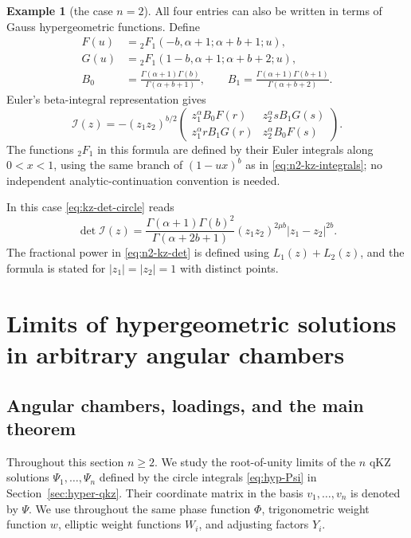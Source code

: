 \documentclass[12pt]{amsart}
\theoremstyle{definition}
\numberwithin{equation}{section}
\theoremstyle{definition}
\newtheorem*{example}{Example}
\let\mc\mathcal
\let\ge\geqslant
\def\beq{\begin{equation}}
\def\eeq{\end{equation}}
\begin{document}
\begin{example}[the case $n=2$]
All four entries can also be written in terms of Gauss
hypergeometric functions. Define
\[
 \begin{aligned}
 F(u)&={}_2F_1(-b,\alpha+1;\alpha+b+1;u),\\
 G(u)&={}_2F_1(1-b,\alpha+1;\alpha+b+2;u),\\
 B_0&=\frac{\Gamma(\alpha+1)\Gamma(b)}
 {\Gamma(\alpha+b+1)},\qquad
 B_1=\frac{\Gamma(\alpha+1)\Gamma(b+1)}
 {\Gamma(\alpha+b+2)}.
 \end{aligned}
\]
Euler's beta-integral representation gives
\beq\label{eq:n2-kz-hypergeom}
 \boxed{\quad
 \mc I(z)=-(z_1z_2)^{b/2}
 \begin{pmatrix}
 z_1^\alpha B_0F(r)&z_2^\alpha sB_1G(s)\\[4pt]
 z_1^\alpha rB_1G(r)&z_2^\alpha B_0F(s)
 \end{pmatrix}.
 \quad}
\eeq
The functions ${}_2F_1$ in this formula are defined by their
Euler integrals along $0<x<1$, using the same branch of
$(1-ux)^b$ as in \eqref{eq:n2-kz-integrals}; no independent
analytic-continuation convention is needed.

In this case \eqref{eq:kz-det-circle} reads
\beq\label{eq:n2-kz-det}
 \boxed{\quad
 \det\mc I(z)=
 \frac{\Gamma(\alpha+1)\Gamma(b)^2}
 {\Gamma(\alpha+2b+1)}
 (z_1z_2)^{2\mu b}|z_1-z_2|^{2b}.
 \quad}
\eeq
The fractional power in \eqref{eq:n2-kz-det} is defined
using $L_1(z)+L_2(z)$, and the formula is stated for
$|z_1|=|z_2|=1$ with distinct points.
\end{example}

\section{Limits of hypergeometric solutions in arbitrary angular chambers}
\label{sec:hyper-limit}

\subsection{Angular chambers, loadings, and the main theorem}
\label{subsec:hyp-limit-all-chambers}

Throughout this section $n\ge2$.  We study the root-of-unity
limits of the $n$ qKZ solutions $\Psi_1,\ldots,\Psi_n$ defined by
the circle integrals \eqref{eq:hyp-Psi} in
Section~\ref{sec:hyper-qkz}.  Their coordinate matrix in the
basis $v_1,\ldots,v_n$ is denoted by $\Psi$.  We use throughout
the same phase function $\Phi$, trigonometric weight function $w$,
elliptic weight functions $W_i$, and adjusting factors $Y_i$.
\end{document}
